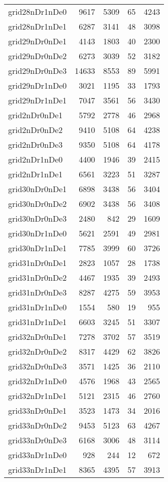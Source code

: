 \begin{longtable}{lrrrr}
grid28nDr1nDe0 & 9617 & 5309 & 65 & 4243 \\
grid28nDr1nDe1 & 6287 & 3141 & 48 & 3098 \\
grid29nDr0nDe1 & 4143 & 1803 & 40 & 2300 \\
grid29nDr0nDe2 & 6273 & 3039 & 52 & 3182 \\
grid29nDr0nDe3 & 14633 & 8553 & 89 & 5991 \\
grid29nDr1nDe0 & 3021 & 1195 & 33 & 1793 \\
grid29nDr1nDe1 & 7047 & 3561 & 56 & 3430 \\
grid2nDr0nDe1 & 5792 & 2778 & 46 & 2968 \\
grid2nDr0nDe2 & 9410 & 5108 & 64 & 4238 \\
grid2nDr0nDe3 & 9350 & 5108 & 64 & 4178 \\
grid2nDr1nDe0 & 4400 & 1946 & 39 & 2415 \\
grid2nDr1nDe1 & 6561 & 3223 & 51 & 3287 \\
grid30nDr0nDe1 & 6898 & 3438 & 56 & 3404 \\
grid30nDr0nDe2 & 6902 & 3438 & 56 & 3408 \\
grid30nDr0nDe3 & 2480 & 842 & 29 & 1609 \\
grid30nDr1nDe0 & 5621 & 2591 & 49 & 2981 \\
grid30nDr1nDe1 & 7785 & 3999 & 60 & 3726 \\
grid31nDr0nDe1 & 2823 & 1057 & 28 & 1738 \\
grid31nDr0nDe2 & 4467 & 1935 & 39 & 2493 \\
grid31nDr0nDe3 & 8287 & 4275 & 59 & 3953 \\
grid31nDr1nDe0 & 1554 & 580 & 19 & 955 \\
grid31nDr1nDe1 & 6603 & 3245 & 51 & 3307 \\
grid32nDr0nDe1 & 7278 & 3702 & 57 & 3519 \\
grid32nDr0nDe2 & 8317 & 4429 & 62 & 3826 \\
grid32nDr0nDe3 & 3571 & 1425 & 36 & 2110 \\
grid32nDr1nDe0 & 4576 & 1968 & 43 & 2565 \\
grid32nDr1nDe1 & 5121 & 2315 & 46 & 2760 \\
grid33nDr0nDe1 & 3523 & 1473 & 34 & 2016 \\
grid33nDr0nDe2 & 9453 & 5123 & 63 & 4267 \\
grid33nDr0nDe3 & 6168 & 3006 & 48 & 3114 \\
grid33nDr1nDe0 & 928 & 244 & 12 & 672 \\
grid33nDr1nDe1 & 8365 & 4395 & 57 & 3913 \\

\end{longtable}
